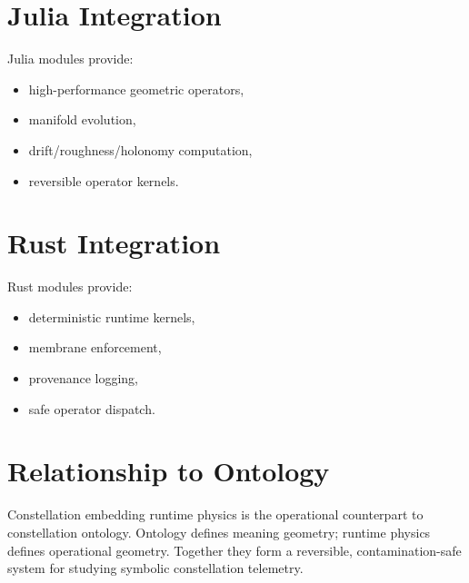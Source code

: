 \documentclass[12pt]{article}
\begin{document}
\section{Julia Integration}

Julia modules provide:
\begin{itemize}
  \item high-performance geometric operators,
  \item manifold evolution,
  \item drift/roughness/holonomy computation,
  \item reversible operator kernels.
\end{itemize}

\section{Rust Integration}

Rust modules provide:
\begin{itemize}
  \item deterministic runtime kernels,
  \item membrane enforcement,
  \item provenance logging,
  \item safe operator dispatch.
\end{itemize}

\section{Relationship to Ontology}

Constellation embedding runtime physics is the operational counterpart to
constellation ontology. Ontology defines meaning geometry; runtime physics
defines operational geometry. Together they form a reversible,
contamination-safe system for studying symbolic constellation telemetry.
\end{document}
